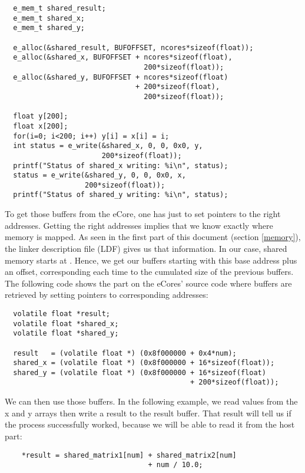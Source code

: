 \begin{lstlisting}
  e_mem_t shared_result;
  e_mem_t shared_x;
  e_mem_t shared_y;
  
  e_alloc(&shared_result, BUFOFFSET, ncores*sizeof(float));
  e_alloc(&shared_x, BUFOFFSET + ncores*sizeof(float), 
                                 200*sizeof(float));
  e_alloc(&shared_y, BUFOFFSET + ncores*sizeof(float) 
                               + 200*sizeof(float), 
                                 200*sizeof(float));
  
  float y[200];
  float x[200];
  for(i=0; i<200; i++) y[i] = x[i] = i;
  int status = e_write(&shared_x, 0, 0, 0x0, y, 
                       200*sizeof(float));
  printf("Status of shared_x writing: %i\n", status);
  status = e_write(&shared_y, 0, 0, 0x0, x, 
                   200*sizeof(float));
  printf("Status of shared_y writing: %i\n", status);
\end{lstlisting}

To get those buffers from the \gls{eCore}, one has just to set pointers to the right addresses. Getting the right addresses implies that we know exactly where memory is mapped. As seen in the first part of this document (section \ref{memory}), the linker description file (\gls{LDF}) gives us that information. In our case, shared memory starts at . Hence, we get our buffers starting with this base address plus an offset, corresponding each time to the cumulated size of the previous buffers. The following code shows the part on the \glspl{eCore}' source code where buffers are retrieved by setting pointers to corresponding addresses:

\begin{lstlisting}
  volatile float *result;
  volatile float *shared_x;
  volatile float *shared_y;
  
  result   = (volatile float *) (0x8f000000 + 0x4*num);
  shared_x = (volatile float *) (0x8f000000 + 16*sizeof(float));
  shared_y = (volatile float *) (0x8f000000 + 16*sizeof(float) 
                                            + 200*sizeof(float));
\end{lstlisting}

We can then use those buffers. In the following example, we read values from the x and y arrays then write a result to the result buffer. That result will tell us if the process successfully worked, because we will be able to read it from the host part:

\begin{lstlisting}
	*result = shared_matrix1[num] + shared_matrix2[num] 
	                              + num / 10.0;
\end{lstlisting}

